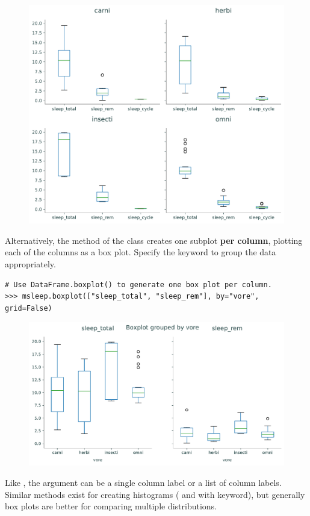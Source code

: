 \begin{figure}[H]
    \centering
    \includegraphics[width=.7\textwidth]{figures/mammal_box_groups.pdf}
\end{figure}

Alternatively, the  method of the  class creates one subplot \textbf{per column}, plotting each of the columns as a box plot.
Specify the  keyword to group the data appropriately.

\begin{lstlisting}
# Use DataFrame.boxplot() to generate one box plot per column.
>>> msleep.boxplot(["sleep_total", "sleep_rem"], by="vore", grid=False)
\end{lstlisting}

\begin{figure}[H]
    \centering
    \includegraphics[width=.7\textwidth]{figures/mammal_box_cols.pdf}
\end{figure}

Like , the  argument can be a single column label or a list of column labels.
Similar methods exist for creating histograms ( and  with  keyword), but generally box plots are better for comparing multiple distributions.

